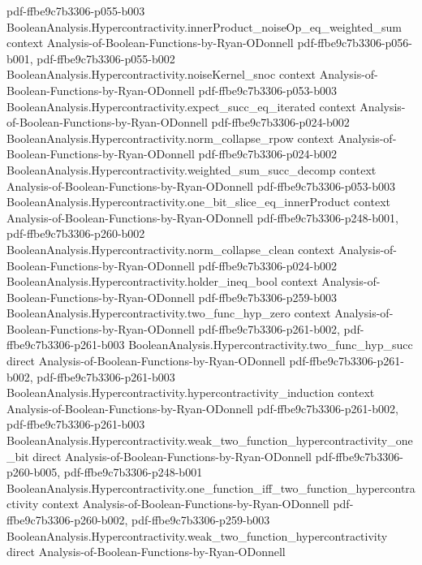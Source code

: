 \begin{theorem}
{    pdf-ffbe9c7b3306-p055-b003}
\proofstep
  {BooleanAnalysis.Hypercontractivity.innerProduct_noiseOp_eq_weighted_sum}
  {context}
  {Analysis-of-Boolean-Functions-by-Ryan-ODonnell}
  {pdf-ffbe9c7b3306-p056-b001,
    pdf-ffbe9c7b3306-p055-b002}
\proofstep
  {BooleanAnalysis.Hypercontractivity.noiseKernel_snoc}
  {context}
  {Analysis-of-Boolean-Functions-by-Ryan-ODonnell}
  {pdf-ffbe9c7b3306-p053-b003}
\proofstep
  {BooleanAnalysis.Hypercontractivity.expect_succ_eq_iterated}
  {context}
  {Analysis-of-Boolean-Functions-by-Ryan-ODonnell}
  {pdf-ffbe9c7b3306-p024-b002}
\proofstep
  {BooleanAnalysis.Hypercontractivity.norm_collapse_rpow}
  {context}
  {Analysis-of-Boolean-Functions-by-Ryan-ODonnell}
  {pdf-ffbe9c7b3306-p024-b002}
\proofstep
  {BooleanAnalysis.Hypercontractivity.weighted_sum_succ_decomp}
  {context}
  {Analysis-of-Boolean-Functions-by-Ryan-ODonnell}
  {pdf-ffbe9c7b3306-p053-b003}
\proofstep
  {BooleanAnalysis.Hypercontractivity.one_bit_slice_eq_innerProduct}
  {context}
  {Analysis-of-Boolean-Functions-by-Ryan-ODonnell}
  {pdf-ffbe9c7b3306-p248-b001,
    pdf-ffbe9c7b3306-p260-b002}
\proofstep
  {BooleanAnalysis.Hypercontractivity.norm_collapse_clean}
  {context}
  {Analysis-of-Boolean-Functions-by-Ryan-ODonnell}
  {pdf-ffbe9c7b3306-p024-b002}
\proofstep
  {BooleanAnalysis.Hypercontractivity.holder_ineq_bool}
  {context}
  {Analysis-of-Boolean-Functions-by-Ryan-ODonnell}
  {pdf-ffbe9c7b3306-p259-b003}
\proofstep
  {BooleanAnalysis.Hypercontractivity.two_func_hyp_zero}
  {context}
  {Analysis-of-Boolean-Functions-by-Ryan-ODonnell}
  {pdf-ffbe9c7b3306-p261-b002,
    pdf-ffbe9c7b3306-p261-b003}
\proofstep
  {BooleanAnalysis.Hypercontractivity.two_func_hyp_succ}
  {direct}
  {Analysis-of-Boolean-Functions-by-Ryan-ODonnell}
  {pdf-ffbe9c7b3306-p261-b002,
    pdf-ffbe9c7b3306-p261-b003}
\proofstep
  {BooleanAnalysis.Hypercontractivity.hypercontractivity_induction}
  {context}
  {Analysis-of-Boolean-Functions-by-Ryan-ODonnell}
  {pdf-ffbe9c7b3306-p261-b002,
    pdf-ffbe9c7b3306-p261-b003}
\proofstep
  {BooleanAnalysis.Hypercontractivity.weak_two_function_hypercontractivity_one_bit}
  {direct}
  {Analysis-of-Boolean-Functions-by-Ryan-ODonnell}
  {pdf-ffbe9c7b3306-p260-b005,
    pdf-ffbe9c7b3306-p248-b001}
\proofstep
  {BooleanAnalysis.Hypercontractivity.one_function_iff_two_function_hypercontractivity}
  {context}
  {Analysis-of-Boolean-Functions-by-Ryan-ODonnell}
  {pdf-ffbe9c7b3306-p260-b002,
    pdf-ffbe9c7b3306-p259-b003}
\proofstep
  {BooleanAnalysis.Hypercontractivity.weak_two_function_hypercontractivity}
  {direct}
  {Analysis-of-Boolean-Functions-by-Ryan-ODonnell}

\end{theorem}
